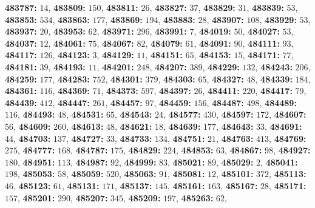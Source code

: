 \textsf{\bfseries 483787:} $14$, \textsf{\bfseries 483809:} $150$, \textsf{\bfseries 483811:} $26$, \textsf{\bfseries 483827:} $37$, \textsf{\bfseries 483829:} $31$, \textsf{\bfseries 483839:} $53$, \textsf{\bfseries 483853:} $534$, \textsf{\bfseries 483863:} $177$, \textsf{\bfseries 483869:} $194$, \textsf{\bfseries 483883:} $28$, \textsf{\bfseries 483907:} $108$, \textsf{\bfseries 483929:} $53$, \textsf{\bfseries 483937:} $20$, \textsf{\bfseries 483953:} $62$, \textsf{\bfseries 483971:} $296$, \textsf{\bfseries 483991:} $7$, \textsf{\bfseries 484019:} $50$, \textsf{\bfseries 484027:} $53$, \textsf{\bfseries 484037:} $12$, \textsf{\bfseries 484061:} $75$, \textsf{\bfseries 484067:} $82$, \textsf{\bfseries 484079:} $61$, \textsf{\bfseries 484091:} $90$, \textsf{\bfseries 484111:} $93$, \textsf{\bfseries 484117:} $126$, \textsf{\bfseries 484123:} $3$, \textsf{\bfseries 484129:} $11$, \textsf{\bfseries 484151:} $65$, \textsf{\bfseries 484153:} $15$, \textsf{\bfseries 484171:} $77$, \textsf{\bfseries 484181:} $39$, \textsf{\bfseries 484193:} $11$, \textsf{\bfseries 484201:} $248$, \textsf{\bfseries 484207:} $389$, \textsf{\bfseries 484229:} $132$, \textsf{\bfseries 484243:} $206$, \textsf{\bfseries 484259:} $177$, \textsf{\bfseries 484283:} $752$, \textsf{\bfseries 484301:} $379$, \textsf{\bfseries 484303:} $65$, \textsf{\bfseries 484327:} $48$, \textsf{\bfseries 484339:} $184$, \textsf{\bfseries 484361:} $116$, \textsf{\bfseries 484369:} $71$, \textsf{\bfseries 484373:} $597$, \textsf{\bfseries 484397:} $26$, \textsf{\bfseries 484411:} $220$, \textsf{\bfseries 484417:} $79$, \textsf{\bfseries 484439:} $412$, \textsf{\bfseries 484447:} $261$, \textsf{\bfseries 484457:} $97$, \textsf{\bfseries 484459:} $156$, \textsf{\bfseries 484487:} $498$, \textsf{\bfseries 484489:} $116$, \textsf{\bfseries 484493:} $48$, \textsf{\bfseries 484531:} $65$, \textsf{\bfseries 484543:} $24$, \textsf{\bfseries 484577:} $430$, \textsf{\bfseries 484597:} $172$, \textsf{\bfseries 484607:} $56$, \textsf{\bfseries 484609:} $260$, \textsf{\bfseries 484613:} $48$, \textsf{\bfseries 484621:} $18$, \textsf{\bfseries 484639:} $177$, \textsf{\bfseries 484643:} $33$, \textsf{\bfseries 484691:} $44$, \textsf{\bfseries 484703:} $137$, \textsf{\bfseries 484727:} $33$, \textsf{\bfseries 484733:} $134$, \textsf{\bfseries 484751:} $21$, \textsf{\bfseries 484763:} $413$, \textsf{\bfseries 484769:} $275$, \textsf{\bfseries 484777:} $168$, \textsf{\bfseries 484787:} $175$, \textsf{\bfseries 484829:} $224$, \textsf{\bfseries 484853:} $63$, \textsf{\bfseries 484867:} $98$, \textsf{\bfseries 484927:} $180$, \textsf{\bfseries 484951:} $113$, \textsf{\bfseries 484987:} $92$, \textsf{\bfseries 484999:} $83$, \textsf{\bfseries 485021:} $89$, \textsf{\bfseries 485029:} $2$, \textsf{\bfseries 485041:} $198$, \textsf{\bfseries 485053:} $58$, \textsf{\bfseries 485059:} $520$, \textsf{\bfseries 485063:} $91$, \textsf{\bfseries 485081:} $12$, \textsf{\bfseries 485101:} $372$, \textsf{\bfseries 485113:} $46$, \textsf{\bfseries 485123:} $61$, \textsf{\bfseries 485131:} $171$, \textsf{\bfseries 485137:} $145$, \textsf{\bfseries 485161:} $163$, \textsf{\bfseries 485167:} $28$, \textsf{\bfseries 485171:} $157$, \textsf{\bfseries 485201:} $290$, \textsf{\bfseries 485207:} $345$, \textsf{\bfseries 485209:} $197$, \textsf{\bfseries 485263:} $62$, 
